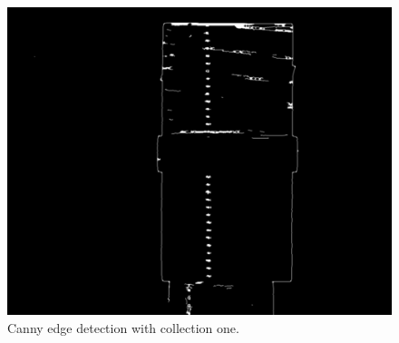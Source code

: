 \begin{figure}[ht!]
\begin{minipage}[t]{0.3\textwidth}
		\centering	
		\includegraphics[width=1\textwidth]{figures/ImageAnalysis/Canny/s6.png}
	\end{minipage}
	\caption{Canny edge detection with collection one.}
	\label{fig:Canny1}
	
	\vspace{0.02\textheight}
	

\end{figure}
